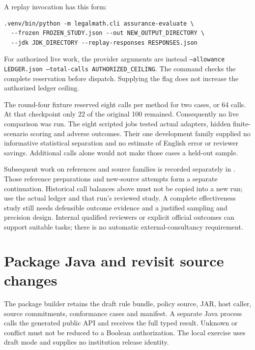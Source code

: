 A replay invocation has this form:
\begin{lstlisting}
.venv/bin/python -m legalmath.cli assurance-evaluate \
  --frozen FROZEN_STUDY.json --out NEW_OUTPUT_DIRECTORY \
  --jdk JDK_DIRECTORY --replay-responses RESPONSES.json
\end{lstlisting}
For authorized live work, the provider arguments are instead
\texttt{--allowance LEDGER.json --total-calls AUTHORIZED\_CEILING}.
The command checks the complete reservation before dispatch. Supplying the
flag does not increase the authorized ledger ceiling.

The round-four fixture reserved eight calls per method for two cases, or 64
calls. At that checkpoint only 22 of the original 100 remained. Consequently
no live comparison was run. The eight scripted jobs tested actual adapters,
hidden finite-scenario scoring and adverse outcomes. Their one development
family supplied no informative statistical separation and no estimate of
English error or reviewer savings. Additional calls alone would not make
those cases a held-out sample.

Subsequent work on references and source families is recorded separately in
. Those reference preparations and new-source attempts form a separate
continuation. Historical call balances above must not be copied into a new run; use
the actual ledger and that run's reviewed study. A complete effectiveness study
still needs defensible outcome evidence and a justified sampling and precision
design. Internal qualified reviewers or explicit official outcomes can support
suitable tasks; there is no automatic external-consultancy requirement.

\section{Package Java and revisit source changes}

The package builder retains the draft rule bundle, policy source, JAR, host
caller, source commitments, conformance cases and manifest. A separate Java
process calls the generated public API and receives the full typed result.
Unknown or conflict must not be reduced to a Boolean authorization. The local
exercise uses draft mode and supplies no institution release identity.

